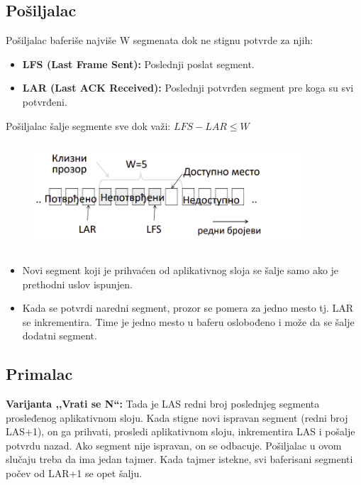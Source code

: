 \documentclass[a4paper]{article}
\begin{document}
    \subsection{Pošiljalac}
        \noindent Pošiljalac baferiše najviše W segmenata dok ne stignu potvrde za njih:
        \begin{itemize}
            \item \textbf{LFS (Last Frame Sent):} Poslednji poslat segment.
            \item \textbf{LAR (Last ACK Received):} Poslednji potvrđen segment pre koga su svi potvrđeni.
        \end{itemize}
        Pošiljalac šalje segmente sve dok važi: $LFS - LAR \leq W$
        \begin{figure}[H]
            \begin{center}
                \includegraphics[width=100mm,height=40mm]{Slike/tps_klizni_prozori.png}
            \end{center}
        \end{figure}
        \begin{itemize}
            \item Novi segment koji je prihvaćen od aplikativnog sloja se šalje samo ako
                  je prethodni uslov ispunjen. 
            \item Kada se potvrdi naredni segment, prozor se pomera za jedno mesto tj. LAR se
                  inkrementira. Time je jedno mesto u baferu oslobođeno i može da se šalje
                  dodatni segment. 
        \end{itemize}

    \subsection{Primalac}
        \textbf{Varijanta ,,Vrati se N``:} Tada je LAS redni broj poslednjeg segmenta prosleđenog
        aplikativnom sloju. Kada stigne novi ispravan segment (redni broj LAS+1), on ga prihvati, 
        prosledi aplikativnom sloju, inkrementira LAS i pošalje potvrdu nazad. Ako segment nije
        ispravan, on se odbacuje. Pošiljalac u ovom slučaju treba da ima jedan tajmer.
        Kada tajmer istekne, svi baferisani segmenti počev od LAR+1 se opet šalju. \\
\end{document}
